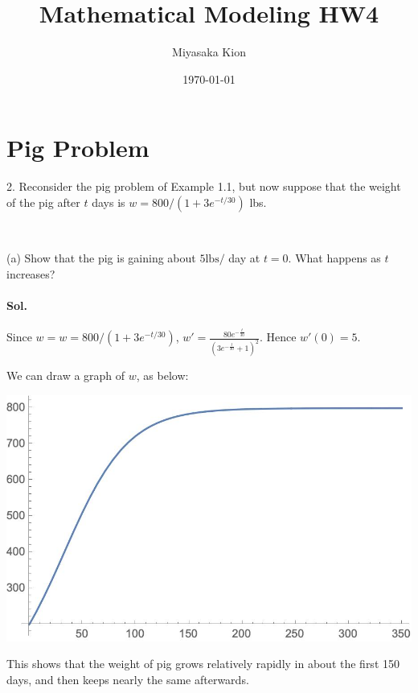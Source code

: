\documentclass[11pt]{article}
\title{Mathematical Modeling HW4}
\author{Miyasaka Kion}
\date{\today}
\begin{document}
	
\maketitle


\section{Pig Problem}
2. Reconsider the pig problem of Example 1.1, but now suppose that the weight of the pig after $t$ days is $w=800 /\left(1+3 e^{-t / 30}\right)$ lbs.

\


(a) Show that the pig is gaining about $5 \mathrm{lbs} /$ day at $t=0$. What happens as $t$ increases?
\paragraph{Sol.} 
  
Since $w =w=800 /\left(1+3 e^{-t / 30}\right) $, $w' = \frac{80 e^{-\frac{t}{30}}}{\left(3 e^{-\frac{t}{30}}+1\right)^2}$. Hence $w'(0) = 5$.

We can draw a graph of $w$, as below:
\begin{center}
	\includegraphics[scale = .5]{pig_1}
\end{center}
This shows that the weight of pig grows relatively rapidly in about the first 150 days, and then keeps nearly the same afterwards.
\end{document}

